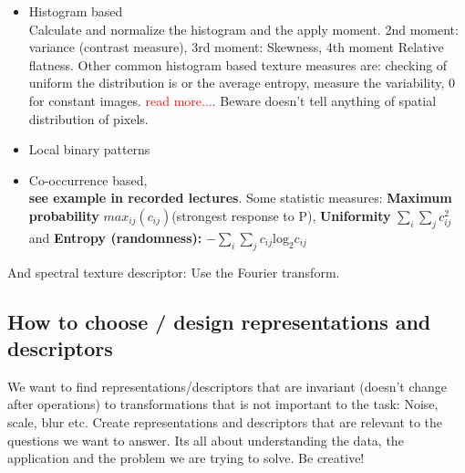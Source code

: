  \begin{itemize}
  	\item Histogram based \\
  	Calculate and normalize the histogram and the apply moment. 2nd moment: variance (contrast measure), 3rd moment: Skewness, 4th moment Relative flatness. Other common histogram based texture measures are: checking of uniform the distribution is or the average entropy, measure the variability, 0 for constant images. \textcolor{red}{read more...}. Beware doesn't tell anything of spatial distribution of pixels. 
  	\item Local binary patterns
  	\item Co-occurrence based, \\
  	\textbf{see example in recorded lectures}. Some statistic measures: \textbf{Maximum probability} $max_{ij}(c_{ij})$(strongest response to P), \textbf{Uniformity} $\sum_{i}^{}\sum_{j}^{} c^{2}_{ij}$ and \textbf{Entropy (randomness):} $-\sum_{i}^{} \sum_{j}^{} c_{ij}\text{log}_2 c_{ij}$   
  \end{itemize} 

 And spectral texture descriptor: Use the Fourier transform.

\subsection*{How to choose / design representations and descriptors}
We want to find representations/descriptors that are invariant (doesn't change after operations) to transformations that is not important to the task: Noise, scale, blur etc. Create representations and descriptors that are relevant to the questions we want to answer. Its all about understanding the data, the application and the problem we are trying to solve. Be creative!






